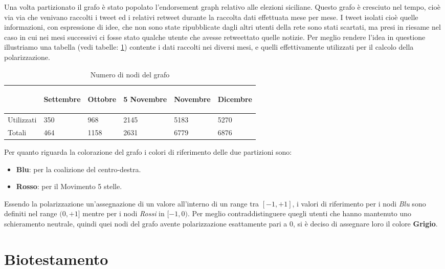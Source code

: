 Una volta partizionato il grafo è stato popolato l'endorsement graph relativo alle elezioni siciliane. Questo grafo è cresciuto nel tempo, cioè via via che venivano raccolti i tweet ed i relativi retweet durante la raccolta dati effettuata mese per mese. I tweet isolati cioè quelle informazioni, con espressione di idee, che non sono state ripubblicate dagli altri utenti della rete sono stati scartati, ma presi in riesame nel caso in cui nei mesi successivi ci fosse stato qualche utente che avesse retweettato quelle notizie.
Per meglio rendere l'idea in questione illustriamo una tabella (vedi tabelle: \ref{Noditotali}) contente i dati raccolti nei diversi mesi, e quelli effettivamente utilizzati per il calcolo della polarizzazione.
\begin{table}

\begin{tabular}{ |p{1.75cm}|p{2cm}|p{2cm}|p{2.5cm}|p{2cm}|p{2cm}| }
 \hline
 
 \begin{center}
 \textbf{}
 \end{center} & \begin{center}
 \textbf{Settembre}
 \end{center}& \begin{center}
 \textbf{Ottobre}
 \end{center} &\begin{center}
 \textbf{5 Novembre}
 \end{center} &\begin{center}
 \textbf{Novembre}
 \end{center} &\begin{center}
 \textbf{Dicembre}
 \end{center} \\
 \hline
 Utilizzati &350 & 968 & 2145 &5183 &5270  \\ \hline
 Totali &464 & 1158 & 2631 &6779 & 6876  \\ 
 \hline
\end{tabular}
\caption{Numero di nodi del grafo}
 \label{Noditotali}
\end{table}
Per quanto riguarda la colorazione del grafo i colori di riferimento delle due partizioni sono: 
\begin{itemize}
\item \textbf{Blu}: per la coalizione del centro-destra.
\item \textbf{Rosso}: per il Movimento 5 stelle.
\end{itemize}

Essendo la polarizzazione un'assegnazione di un valore all'interno di un range tra $[-1,+1]$, i valori di riferimento per i nodi \textit{Blu} sono definiti nel range $(0,+1]$ mentre per i nodi \textit{Rossi} in $[-1,0)$.
Per meglio contraddistinguere quegli utenti che hanno mantenuto uno schieramento neutrale, quindi quei nodi del grafo avente polarizzazione esattamente pari a 0, si è deciso di assegnare loro il colore \textbf{Grigio}.
\newpage
\section{Biotestamento}
